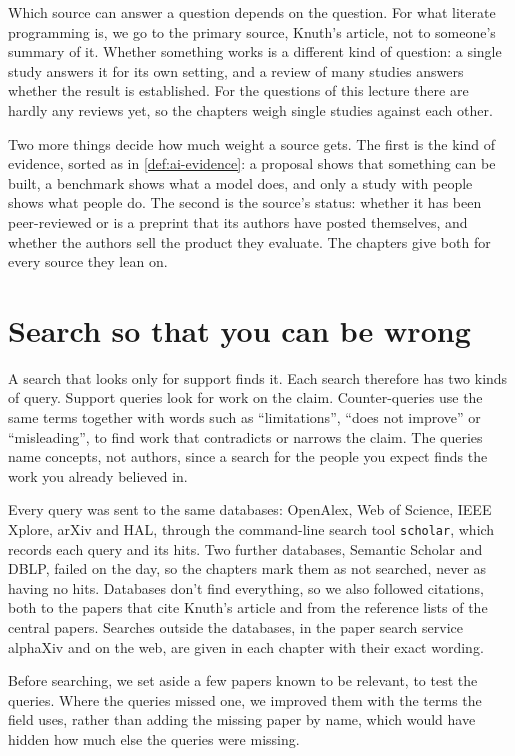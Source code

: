 Which source can answer a question depends on the question.
For what literate programming is, we go to the primary source, Knuth's
article\autocite{Knuth1984}, not to someone's summary of it.
Whether something works is a different kind of question: a single study answers
it for its own setting, and a review of many studies answers whether the result
is established.
For the questions of this lecture there are hardly any reviews yet, so the
chapters weigh single studies against each other.

Two more things decide how much weight a source gets.
The first is the kind of evidence, sorted as in \cref{def:ai-evidence}: a
proposal shows that something can be built, a benchmark shows what a model
does, and only a study with people shows what people do.
The second is the source's status: whether it has been peer-reviewed or is a
preprint that its authors have posted themselves, and whether the authors sell
the product they evaluate.
The chapters give both for every source they lean on.

\section{Search so that you can be wrong}

A search that looks only for support finds it.
Each search therefore has two kinds of query.
Support queries look for work on the claim.
Counter-queries use the same terms together with words such as
\enquote{limitations}, \enquote{does not improve} or \enquote{misleading}, to
find work that contradicts or narrows the claim.
The queries name concepts, not authors, since a search for the people you
expect finds the work you already believed in.

Every query was sent to the same databases: OpenAlex, Web of Science, IEEE
Xplore, arXiv and HAL, through the command-line search tool \texttt{scholar},
which records each query and its hits.
Two further databases, Semantic Scholar and DBLP, failed on the day, so the
chapters mark them as not searched, never as having no hits.
Databases don't find everything, so we also followed citations, both to the
papers that cite Knuth's article and from the reference lists of the central
papers.
Searches outside the databases, in the paper search service alphaXiv and on the
web, are given in each chapter with their exact wording.

Before searching, we set aside a few papers known to be relevant, to test the
queries.
Where the queries missed one, we improved them with the terms the field uses,
rather than adding the missing paper by name, which would have hidden how much
else the queries were missing.

